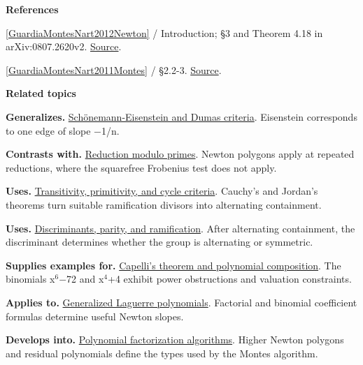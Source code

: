 \documentclass[11pt,a4paper,oneside,openany]{book}
\newenvironment{sources}{\par\smallskip\begingroup\footnotesize\color{atlasgray}\leftskip=10pt\setlength{\parskip}{2pt}}{\par\endgroup\smallskip}
\begin{document}
\begin{sources}
\textbf{References}\par\smallskip
\noindent\hyperlink{ref:GuardiaMontesNart2012Newton}{[GuardiaMontesNart2012Newton]} / Introduction; §3 and Theorem 4.18 in arXiv:0807.2620v2.  \href{https://doi.org/10.1090/S0002-9947-2011-05442-5}{Source}.\par
\noindent\hyperlink{ref:GuardiaMontesNart2011Montes}{[GuardiaMontesNart2011Montes]} / §2.2-3.  \href{https://www.numdam.org/articles/10.5802/jtnb.782/}{Source}.\par
\end{sources}\color{black}
\par\medskip\begingroup\footnotesize\setlength{\parskip}{1pt}\textbf{\sffamily\color{atlasgreen}Related topics}\par
\color{black}\textbf{Generalizes.} \hyperlink{article:eisenstein-dumas}{Schönemann-Eisenstein and Dumas criteria}. Eisenstein corresponds to one edge of slope \ensuremath{-}1/n.\par
\color{black}\textbf{Contrasts with.} \hyperlink{article:modular-irreducibility}{Reduction modulo primes}. Newton polygons apply at repeated reductions, where the squarefree Frobenius test does not apply.\par
\color{black}\textbf{Uses.} \hyperlink{article:permutation-groups}{Transitivity, primitivity, and cycle criteria}. Cauchy's and Jordan's theorems turn suitable ramification divisors into alternating containment.\par
\color{black}\textbf{Uses.} \hyperlink{article:discriminants}{Discriminants, parity, and ramification}. After alternating containment, the discriminant determines whether the group is alternating or symmetric.\par
\color{black}\textbf{Supplies examples for.} \hyperlink{article:capelli-composition}{Capelli's theorem and polynomial composition}. The binomials x\ensuremath{{}^6}\ensuremath{-}72 and x\ensuremath{{}^4}+4 exhibit power obstructions and valuation constraints.\par
\color{black}\textbf{Applies to.} \hyperlink{article:laguerre}{Generalized Laguerre polynomials}. Factorial and binomial coefficient formulas determine useful Newton slopes.\par
\color{black}\textbf{Develops into.} \hyperlink{article:factorization-algorithms}{Polynomial factorization algorithms}. Higher Newton polygons and residual polynomials define the types used by the Montes algorithm.\par
\endgroup
\end{document}
